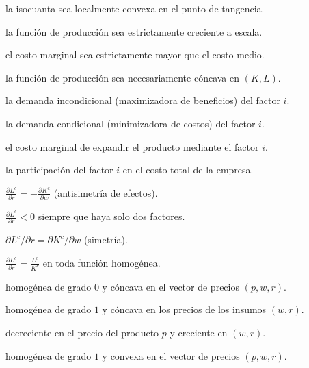 \begin{opts}
    \item la isocuanta sea localmente convexa en el punto de tangencia.
    \item la función de producción sea estrictamente creciente a escala.
    \item el costo marginal sea estrictamente mayor que el costo medio.
    \item la función de producción sea necesariamente cóncava en $(K,L)$.
\end{opts}

\begin{opts}
    \item la demanda incondicional (maximizadora de beneficios) del factor $i$.
    \item la demanda condicional (minimizadora de costos) del factor $i$.
    \item el costo marginal de expandir el producto mediante el factor $i$.
    \item la participación del factor $i$ en el costo total de la empresa.
\end{opts}

\begin{opts}
    \item $\frac{\partial L^c}{\partial r} = -\frac{\partial K^c}{\partial w}$ (antisimetría de efectos).
    \item $\frac{\partial L^c}{\partial r} < 0$ siempre que haya solo dos factores.
    \item $\partial L^c/\partial r = \partial K^c/\partial w$ (simetría).
    \item $\frac{\partial L^c}{\partial r} = \frac{L^c}{K^c}$ en toda función homogénea.
\end{opts}

\begin{opts}
    \item homogénea de grado $0$ y cóncava en el vector de precios $(p, w, r)$.
    \item homogénea de grado $1$ y cóncava en los precios de los insumos $(w,r)$.
    \item decreciente en el precio del producto $p$ y creciente en $(w,r)$.
    \item homogénea de grado $1$ y convexa en el vector de precios $(p, w, r)$.
\end{opts}

